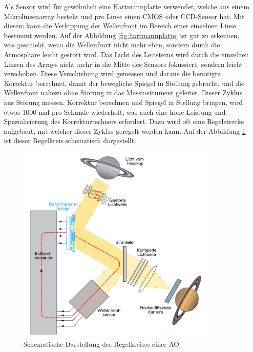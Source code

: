 \begin{refsection}
Als Sensor wird für gewöhnlich eine Hartmannplatte verwendet, welche aus einem Mikrolinsenarray besteht und pro Linse einen CMOS oder CCD-Sensor hat. Mit diesem kann  die Verkippung der Wellenfront im Bereich einer einzelnen Linse bestimmt werden. Auf der Abbildung \ref{fig:hartmannplatte} ist gut zu erkennen, was geschieht, wenn die Wellenfront nicht mehr eben, sondern durch die Atmosphäre leicht gestört wird. Das Licht des Leitsterns wird durch die einzelnen Linsen des Arrays nicht mehr in die Mitte des Sensors fokussiert, sondern leicht verschoben. Diese Verschiebung wird gemessen und daraus die benötigte Korrektur berechnet, damit der bewegliche Spiegel in Stellung gebracht, und die Wellenfront nahezu ohne Störung in das Messinstrument geleitet. Dieser Zyklus aus Störung messen, Korrektur berechnen und Spiegel in Stellung bringen, wird etwas 1000 mal pro Sekunde wiederholt, was auch eine hohe Leistung und Spezialisierung des Korrekturrechners erfordert. Dazu wird oft eine Regelstrecke aufgebaut, mit welcher dieser Zyklus geregelt werden kann. Auf der Abbildung \ref{fig:schematischAO} ist dieser Regelkreis schematisch dargestellt.

\begin{figure}
  \centering
  \includegraphics[width=0.9\textwidth]{adaptiv/images/schematichAO}
  \caption{Schematische Darstellung des Regelkreises einer AO
    \cite{robani:schematischAO}}
  \label{fig:schematischAO}
\end{figure}


\end{refsection}
